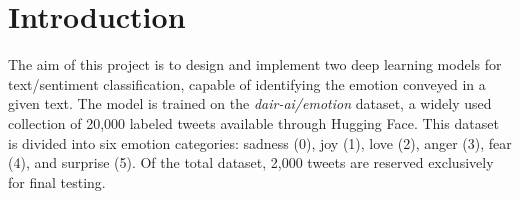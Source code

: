\section{Introduction}
The aim of this project is to design and implement two deep learning models for text/sentiment classification, capable of identifying the emotion conveyed in a given text. The model is trained on the \textit{dair-ai/emotion} dataset, a widely used collection of 20,000 labeled tweets available through Hugging Face. This dataset is divided into six emotion categories: sadness (0), joy (1), love (2), anger (3), fear (4), and surprise (5). Of the total dataset, 2,000 tweets are reserved exclusively for final testing.